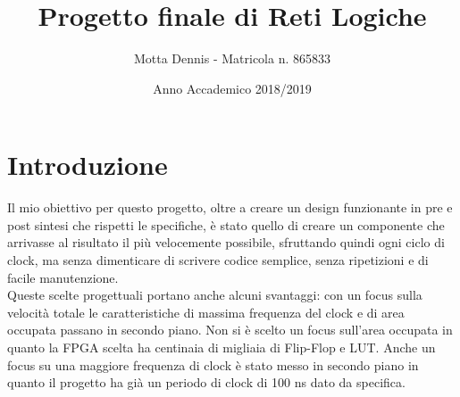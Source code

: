 \documentclass{article}
\title{Progetto finale di Reti Logiche}
\author{Motta Dennis - Matricola n. 865833}
\date{Anno Accademico 2018/2019}
\begin{document}
\maketitle
\tableofcontents


\pagebreak
\section{Introduzione} \label{subsection-introduz}
Il mio obiettivo per questo progetto, oltre a creare un design funzionante in pre e post sintesi che rispetti le specifiche, è stato quello di creare un componente che arrivasse al risultato il più velocemente possibile, sfruttando quindi ogni ciclo di clock, ma senza dimenticare di scrivere codice semplice, senza ripetizioni e di facile manutenzione.\\
Queste scelte progettuali portano anche alcuni svantaggi: con un focus sulla velocità totale le caratteristiche di massima frequenza del clock e di area occupata passano in secondo piano. Non si è scelto un focus sull'area occupata in quanto la FPGA scelta ha centinaia di migliaia di Flip-Flop e LUT. Anche un focus su una maggiore frequenza di clock è stato messo in secondo piano in quanto il progetto ha già un periodo di clock di 100 ns dato da specifica.
\end{document}
